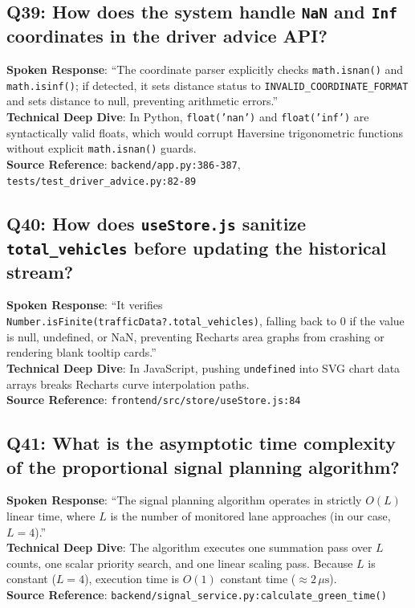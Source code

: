 \documentclass[11pt,a4paper,oneside]{report}
\begin{document}
\subsection*{Q39: How does the system handle \texttt{NaN} and \texttt{Inf} coordinates in the driver advice API?}
\begin{interviewbox}
\textbf{Spoken Response}: ``The coordinate parser explicitly checks \texttt{math.isnan()} and \texttt{math.isinf()}; if detected, it sets distance status to \texttt{INVALID\_COORDINATE\_FORMAT} and sets distance to null, preventing arithmetic errors.''\\
\textbf{Technical Deep Dive}: In Python, \texttt{float('nan')} and \texttt{float('inf')} are syntactically valid floats, which would corrupt Haversine trigonometric functions without explicit \texttt{math.isnan()} guards.\\
\textbf{Source Reference}: \texttt{backend/app.py:386-387}, \texttt{tests/test\_driver\_advice.py:82-89}
\end{interviewbox}

\subsection*{Q40: How does \texttt{useStore.js} sanitize \texttt{total\_vehicles} before updating the historical stream?}
\begin{interviewbox}
\textbf{Spoken Response}: ``It verifies \texttt{Number.isFinite(trafficData?.total\_vehicles)}, falling back to 0 if the value is null, undefined, or NaN, preventing Recharts area graphs from crashing or rendering blank tooltip cards.''\\
\textbf{Technical Deep Dive}: In JavaScript, pushing \texttt{undefined} into SVG chart data arrays breaks Recharts curve interpolation paths.\\
\textbf{Source Reference}: \texttt{frontend/src/store/useStore.js:84}
\end{interviewbox}

\subsection*{Q41: What is the asymptotic time complexity of the proportional signal planning algorithm?}
\begin{interviewbox}
\textbf{Spoken Response}: ``The signal planning algorithm operates in strictly $O(L)$ linear time, where $L$ is the number of monitored lane approaches (in our case, $L = 4$).''\\
\textbf{Technical Deep Dive}: The algorithm executes one summation pass over $L$ counts, one scalar priority search, and one linear scaling pass. Because $L$ is constant ($L=4$), execution time is $O(1)$ constant time ($\approx 2\,\mu\text{s}$).\\
\textbf{Source Reference}: \texttt{backend/signal\_service.py:calculate\_green\_time()}
\end{interviewbox}
\end{document}
